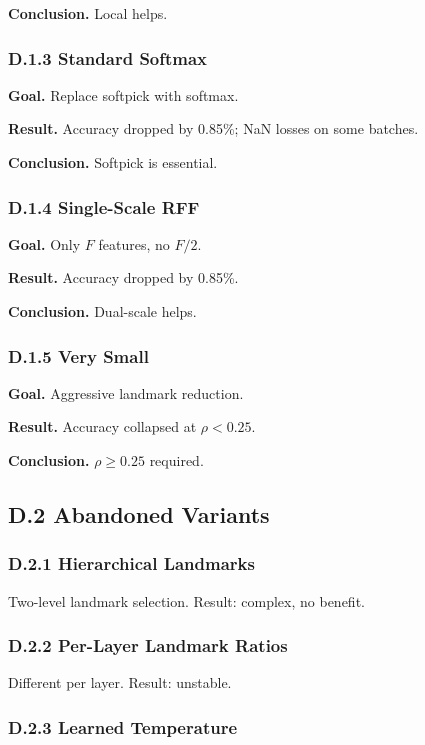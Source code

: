 \textbf{Conclusion.} Local helps.

\subsubsection{D.1.3 Standard Softmax}

\textbf{Goal.} Replace softpick with softmax.

\textbf{Result.} Accuracy dropped by 0.85\%; NaN losses on some 
batches.

\textbf{Conclusion.} Softpick is essential.

\subsubsection{D.1.4 Single-Scale RFF}

\textbf{Goal.} Only $F$ features, no $F/2$.

\textbf{Result.} Accuracy dropped by 0.85\%.

\textbf{Conclusion.} Dual-scale helps.

\subsubsection{D.1.5 Very Small}

\textbf{Goal.} Aggressive landmark reduction.

\textbf{Result.} Accuracy collapsed at $\rho < 0.25$.

\textbf{Conclusion.} $\rho \geq 0.25$ required.

\subsection{D.2 Abandoned Variants}

\subsubsection{D.2.1 Hierarchical Landmarks}

Two-level landmark selection. Result: complex, no benefit.

\subsubsection{D.2.2 Per-Layer Landmark Ratios}

Different   per layer. Result: unstable.

\subsubsection{D.2.3 Learned Temperature}

